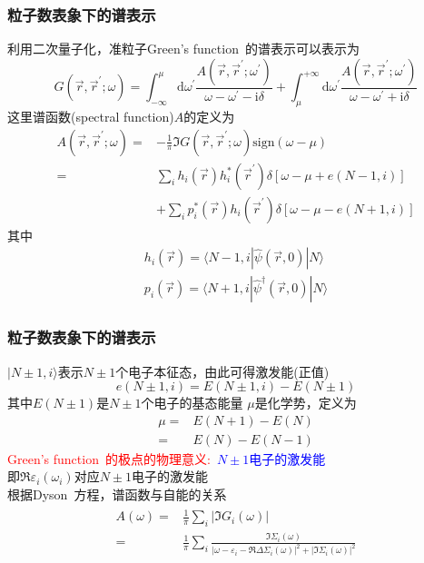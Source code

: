 \documentclass[cjk,slidestop,compress,mathserif,blue]{beamer}
\begin{document}
\frame
{
	\frametitle{粒子数表象下的谱表示}
利用二次量子化，准粒子\textrm{Green's function~}的谱表示可以表示为
\begin{displaymath}
	G(\vec r,\vec r^{\prime};\omega)=\int_{-\infty}^{\mu}\mathrm{d}\omega^{\prime}\frac{A(\vec r,\vec r^{\prime};\omega^{\prime})}{\omega-\omega^{\prime}-\mathrm{i}\delta}+\int_{\mu}^{+\infty}\mathrm{d}\omega^{\prime}\frac{A(\vec r,\vec r^{\prime};\omega^{\prime})}{\omega-\omega^{\prime}+\mathrm{i}\delta}
\end{displaymath}
这里谱函数(\textrm{spectral function})$A$的定义为
\begin{displaymath}
	\begin{aligned}
		A(\vec r,\vec r^{\prime};\omega)=&-\frac1{\pi}\Im G(\vec r,\vec r^{\prime};\omega)\textrm{sign}(\omega-\mu)\\
		=&\sum_ih_i(\vec r)h_i^{\ast}(\vec r^{\prime})\delta[\omega-\mu+e(N-1,i)]\\
		&+\sum_ip_i^{\ast}(\vec r)h_i(\vec r^{\prime})\delta[\omega-\mu-e(N+1,i)]
	\end{aligned}
\end{displaymath}
其中
\begin{displaymath}
	\begin{aligned}
		h_i(\vec r)=\langle N-1,i|\hat{\psi}(\vec r,0)|N\rangle\\
		p_i(\vec r)=\langle N+1,i|\hat{\psi}^{\dag}(\vec r,0)|N\rangle
	\end{aligned}
\end{displaymath}
}

\frame
{
	\frametitle{粒子数表象下的谱表示}
	$|N\pm1,i\rangle$表示$N\pm1$个电子本征态，由此可得激发能(正值)
	\begin{displaymath}
		e(N\pm1,i)=E(N\pm1,i)-E(N\pm1)
	\end{displaymath}
	其中$E(N\pm1)$是$N\pm1$个电子的基态能量
	\vskip 5pt
	$\mu$是化学势，定义为
	\begin{displaymath}
		\begin{aligned}
			\mu=&E(N+1)-E(N)\\
			=&E(N)-E(N-1)
		\end{aligned}
	\end{displaymath}
	\textcolor{red}{\textrm{Green's function~}的极点的物理意义:~}\textcolor{blue}{$N\pm1$电子的激发能}\\即$\Re\varepsilon_i(\omega_i)$对应$N\pm1$电子的激发能\\
	根据\textrm{Dyson~}方程，谱函数与自能的关系
	\begin{displaymath}
		\begin{aligned}
			\begin{aligned}
				A(\omega)=&\frac1{\pi}\sum_i|\Im G_i(\omega)|\\
				=&\frac1{\pi}\sum_i\frac{\Im\Sigma_i(\omega)}{|\omega-\varepsilon_i-\Re\Delta\Sigma_i(\omega)|^2+|\Im\Sigma_i(\omega)|^2}
			\end{aligned}
		\end{aligned}
	\end{displaymath}
}
\end{document}
